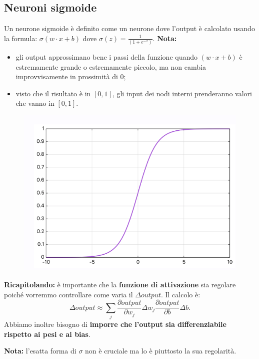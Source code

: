 \subsection{Neuroni sigmoide}
Un neurone sigmoide è definito come un neurone dove l’output è calcolato usando la formula: $\sigma(w\cdot x+b)$ dove $\sigma(z)=\frac{1}{(1+e^{-z})}$.
\textbf{Nota:}
\begin{itemize}
    \item gli output approssimano bene i passi della funzione quando $(w\cdot x+b)$ è estremamente grande o estremamente piccolo, ma  non cambia improvvisamente in prossimità di $0$;
    \item visto che il risultato è in $[0,1]$, gli input dei nodi interni prenderanno valori che vanno in $[0,1]$.
\end{itemize}
\begin{figure}[!h]
    \includegraphics[scale=.6]{images/gradient_descent/sigmoid02.png}
    \centering
\end{figure}


\textbf{Ricapitolando:} è importante che la \textbf{funzione di attivazione} sia regolare poiché vorremmo controllare come varia il $\Delta output$. Il calcolo è:
\begin{equation}
    \Delta output \approx\sum_j \frac{\partial output}{\partial w_j}\Delta w_j\frac{\partial output}{\partial b}\Delta b.
\end{equation}
Abbiamo inoltre bisogno di \textbf{imporre che l'output sia differenziabile rispetto ai pesi e ai bias}.



\textbf{Nota:} l’esatta forma di $\sigma$ non è cruciale ma lo è piuttosto la sua regolarità. 


